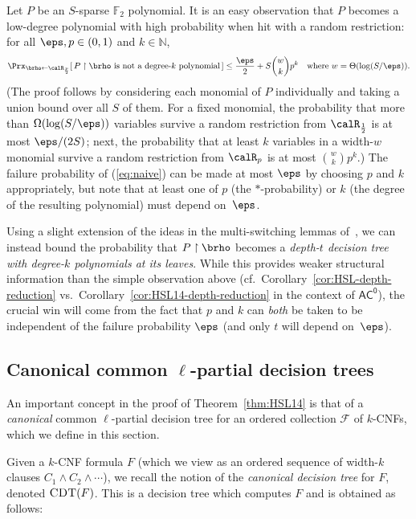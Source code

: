 \documentclass[11pt]{article}
\numberwithin{equation}{section}
\theoremstyle{definition}
\theoremstyle{plain}
\newcommand{\N}{\mathbb N}
\theoremstyle{plain}
\newcommand{\acz}{\mathsf{AC^0}}
\newcommand{\uhr}{\upharpoonright}
\newcommand{\CDT}{\textsc{CDT}}
\renewcommand{\N}{\mathds{N}}
\renewcommand{\F}{\mathds{F}}
\begin{document}
Let $P$ be an $S$-sparse $\F_2$ polynomial. It is an easy observation that $P$ becomes a low-degree polynomial with high probability when hit with a random restriction: for all $\eps, p\in (0,1)$ and $k\in \N$, 
\begin{equation} \Prx_{\brho\leftarrow\calR_{\frac{p}{2}}}[\, P\uhr \brho \text{~is not a degree-$k$ polynomial}\,] \le \frac{\eps}{2} + S{w\choose k}p^k \quad \text{where $w = \Theta(\log(S/\eps))$.} \label{eq:naive}
\end{equation} 
(The proof follows by considering each monomial of $P$ individually and taking a union bound over all $S$ of them. For a fixed monomial, the probability that more than $\Omega(\log(S/\eps))$ variables survive a random restriction from $\calR_{\frac{1}{2}}$ is at most $\eps/(2S)$; next, the probability that at least $k$ variables in a width-$w$ monomial survive a random restriction from $\calR_p$ is at most ${w \choose k}p^k$.)   The failure probability of (\ref{eq:naive}) can be made at most $\eps$ by choosing $p$ and $k$ appropriately, but note that at least one of $p$ (the $\ast$-probability) or $k$ (the degree of the resulting polynomial) must depend on~$\eps$. 

Using a slight extension of the ideas in the multi-switching lemmas of~\cite{Has14}, we can instead bound the probability that $P \uhr \brho$ becomes a \emph{depth-$t$ decision tree with degree-$k$ polynomials at its leaves}.  While this provides weaker structural information than the simple observation above (cf.~Corollary~\ref{cor:HSL-depth-reduction} vs.~Corollary~\ref{cor:HSL14-depth-reduction} in the context of $\acz$), the crucial win will come from the fact that $p$ and $k$ can \emph{both} be taken to be independent of the failure probability $\eps$ (and only $t$ will depend on~$\eps$). 


\subsection{Canonical common $\ell$-partial decision trees} \label{sec:ccdt}

An important concept in the proof of Theorem~\ref{thm:HSL14} is that of a \emph{canonical} common $\ell$-partial decision tree for an ordered collection $\mathscr{F}$ of $k$-CNFs, which we define in this section.

Given a $k$-CNF formula $F$ (which we view as an ordered sequence of width-$k$ clauses $C_1 \wedge C_2 \wedge \cdots$), we recall the notion of the \emph{canonical decision tree} for $F$, denoted $\CDT(F)$.  This is a decision tree which computes $F$ and is obtained as follows:  
\end{document}
